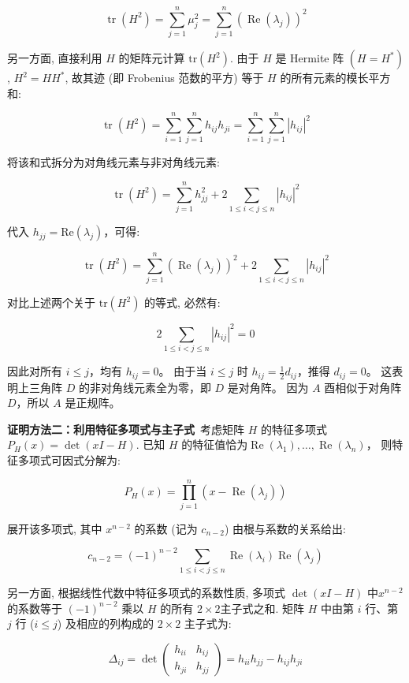 \begin{enumerate}
\[\operatorname{tr} (H^{2}) = \sum_{j=1}^{n} \mu_{j}^{2} 
= \sum_{j=1}^{n} (\operatorname{Re} (\lambda_{j}))^{2}\]

另一方面, 直接利用 $H$ 的矩阵元计算 \(\mathrm{tr}(H^{2})\). 
由于 $H$ 是 Hermite 阵 \((H = H^{*})\), \(H^{2} = HH^{*}\), 
故其迹 (即 Frobenius 范数的平方) 等于 $H$ 的所有元素的模长平方和:

\[\operatorname{tr} (H^{2}) = \sum_{i=1}^{n} \sum_{j=1}^{n} h_{i j} h_{j i} 
= \sum_{i=1}^{n} \sum_{j=1}^{n}|h_{i j}|^{2}\]

将该和式拆分为对角线元素与非对角线元素:

\[\operatorname{tr} \left(H^{2}\right) = \sum_{j=1}^{n} h_{j j}^{2} 
+ 2 \sum_{1 \leqslant i < j \leqslant n} |h_{i j}|^{2}\]

代入 \(h_{jj} = \mathrm{Re}(\lambda_j)\)，可得:

\[\operatorname{tr} (H^{2}) = \sum_{j=1}^{n} (\operatorname{Re} (\lambda_{j}))^{2} 
+ 2 \sum_{1 \leqslant i < j \leqslant n} |h_{i j}|^{2}\]

对比上述两个关于 \(\mathrm{tr}(H^{2})\) 的等式, 必然有:

\[2 \sum_ {1 \leqslant i < j \leqslant n} |h_{i j}|^{2} = 0\]

因此对所有 $i \leqslant j$，均有 \(h_{ij} = 0\)。
由于当 $i \leqslant j$ 时 \(h_{ij} = \frac{1}{2} d_{ij}\)，推得 \(d_{ij} = 0\)。
这表明上三角阵 $D$ 的非对角线元素全为零，即 $D$ 是对角阵。
因为 $A$ 酉相似于对角阵 $D$，所以 $A$ 是正规阵。

\textbf{证明方法二：利用特征多项式与主子式}\ 
考虑矩阵 $H$ 的特征多项式 \(P_{H}(x) = \det(xI - H)\). 
已知 $H$ 的特征值恰为\(\operatorname{Re}(\lambda_{1}), \ldots, \operatorname{Re}(\lambda_{n})\)，
则特征多项式可因式分解为:

\[P_{H} (x) = \prod_{j=1}^{n} (x - \operatorname{Re} (\lambda_{j}))\]

展开该多项式, 其中 \(x^{n-2}\) 的系数 (记为 \(c_{n-2}\)) 由根与系数的关系给出:

\[c_{n-2} = (- 1)^{n-2} \sum_{1 \leqslant i < j \leqslant n} \operatorname{Re} (\lambda_{i}) \operatorname{Re} (\lambda_{j})\]

另一方面, 根据线性代数中特征多项式的系数性质, 
多项式 \(\det(xI-H)\) 中\(x^{n-2}\) 的系数等于 \((-1)^{n-2}\) 
乘以 $H$ 的所有 \(2 \times 2\)主子式之和. 
矩阵 $H$ 中由第 $i$ 行、第 $j$ 行 ($i \leqslant j$)
及相应的列构成的 \(2 \times 2\) 主子式为:

\[\Delta_{i j} = \det \begin{pmatrix} h_{i i} & h_{i j} \\ h_{j i} & h_{j j} \end{pmatrix} 
= h_{i i} h_{j j} - h_{i j} h_{j i}\]


\end{enumerate}

